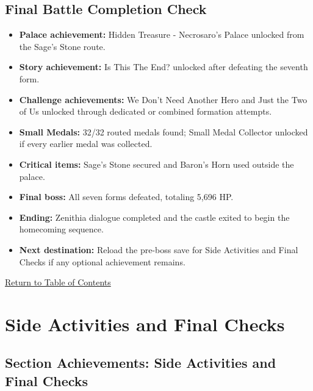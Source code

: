 \documentclass[
  american,
  10pt,
  letterpaper,
  oneside,
  open=any]{scrreprt}
\providecommand{\tightlist}{%
  \setlength{\itemsep}{0pt}\setlength{\parskip}{0pt}}
\begin{document}
\section{Final Battle Completion
Check}\label{final-battle-completion-check}

\begin{itemize}
\tightlist
\item
  \textbf{Palace achievement:} Hidden Treasure - Necrosaro's Palace
  unlocked from the Sage's Stone route.
\item
  \textbf{Story achievement:} Is This The End? unlocked after defeating
  the seventh form.
\item
  \textbf{Challenge achievements:} We Don't Need Another Hero and Just
  the Two of Us unlocked through dedicated or combined formation
  attempts.
\item
  \textbf{Small Medals:} 32/32 routed medals found; Small Medal
  Collector unlocked if every earlier medal was collected.
\item
  \textbf{Critical items:} Sage's Stone secured and Baron's Horn used
  outside the palace.
\item
  \textbf{Final boss:} All seven forms defeated, totaling 5,696 HP.
\item
  \textbf{Ending:} Zenithia dialogue completed and the castle exited to
  begin the homecoming sequence.
\item
  \textbf{Next destination:} Reload the pre-boss save for Side
  Activities and Final Checks if any optional achievement remains.
\end{itemize}

\hyperref[table-of-contents]{Return to Table of Contents}

\chapter{Side Activities and Final
Checks}\label{side-activities-and-final-checks}

\section{Section Achievements: Side Activities and Final
Checks}\label{section-achievements-side-activities-and-final-checks}
\end{document}
